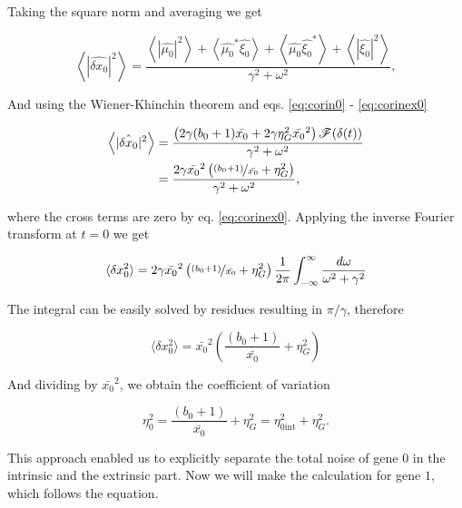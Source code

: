 Taking the square norm and averaging we get

\begin{equation}
\left\langle |\hat{\delta x_0}|^2 \right\rangle = \frac{\left\langle|\hat{\mu_0}|^2\right\rangle + \left\langle\hat{\mu_0}^*\hat{\xi_0}\right\rangle+\left\langle\hat{\mu_0}\hat{\xi_0}^*\right\rangle+\left\langle|\hat{\xi_0}|^2\right\rangle}{\gamma^2 + \omega^2},
\end{equation}

And using the Wiener-Khinchin theorem and eqs. \eqref{eq:corin0} - \eqref{eq:corinex0}


\begin{equation}
  \label{eq:pgene0}
  \begin{split}
    \left\langle |\hat{\delta x_0}|^2 \right\rangle &= \frac{\left(2\gamma(b_0+1)\bar{x_0}+ 2\gamma\eta_G^2\bar{x_0}^2\right)\mathscr{F}(\delta(t))}{\gamma^2+\omega^2}\\
    &=\frac{2\gamma\bar{x_0}^2\left(\nicefrac{(b_0+1)}{\bar{x_0}}+ \eta_G^2\right)}{\gamma^2+\omega^2},
  \end{split}
\end{equation}

where the cross terms are zero by eq. \eqref{eq:corinex0}. Applying the inverse Fourier transform at $t=0$ we get

\begin{equation*}
\langle \delta x_0^2 \rangle = 2\gamma\bar{x_0}^2\left(\nicefrac{(b_0+1)}{\bar{x_0}}+ \eta_G^2\right)\frac{1}{2\pi}\int_{-\infty}^{\infty}\frac{d\omega}{\omega^2+\gamma^2}
\end{equation*}

The integral can be easily solved by residues resulting in $\pi/\gamma$, therefore

\begin{equation*}
\langle \delta x_0^2 \rangle = \bar{x_0}^2\left(\frac{(b_0+1)}{\bar{x_0}}+ \eta_G^2\right)
\end{equation*}

And dividing by $\bar{x_0}^2$, we obtain the coefficient of variation

\begin{equation}
  \label{eq:etagene0}
  \boxed{\eta_0^2 = \frac{(b_0+1)}{\bar{x_0}}+ \eta_G^2 = \eta_{0\text{int}}^2+\eta_G^2}.
\end{equation}

This approach enabled us to explicitly separate the total noise of gene $0$ in the intrinsic and the extrinsic part. Now we will make the calculation for gene $1$, which follows the equation.

